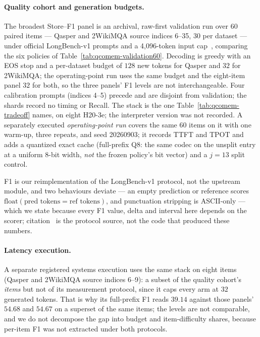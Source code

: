 \documentclass{article}
\begin{document}
\paragraph{Quality cohort and generation budgets.}
The broadest Store--F1 panel is an archival, raw-first validation run over 60
paired items --- Qasper and 2WikiMQA source indices 6--35, 30 per dataset ---
under official LongBench-v1 prompts and a 4,096-token input
cap~\citep{bai2024longbench,dasigi2021qasper,ho2020multihopqa}, comparing the
six policies of Table~\ref{tab:qcomem-validation60}.  Decoding is greedy with an EOS stop and a per-dataset budget of $128$
new tokens for Qasper and $32$ for 2WikiMQA; the operating-point run uses the
same budget and the eight-item panel $32$ for both, so the three panels' F1
levels are not interchangeable.  Four calibration prompts (indices 4--5) precede
and are disjoint from validation; the shards record no timing or Recall.  The stack is the one Table~\ref{tab:qcomem-tradeoff} names, on eight
H20-3e; the interpreter version was not recorded.  A separately executed
\emph{operating-point run} covers the same 60 items on it with one warm-up,
three repeats, and seed 20260903; it records TTFT and TPOT and adds a quantized
exact cache (full-prefix Q8: the same codec on the unsplit entry at a uniform
8-bit width, \emph{not} the frozen policy's bit vector) and a $j=13$ split
control.

F1 is our reimplementation of the LongBench-v1  protocol, not
the upstream module, and two behaviours deviate --- an empty prediction or
reference scores $\mathrm{float}(\text{pred tokens}=\text{ref tokens})$, and
punctuation stripping is ASCII-only --- which we state because every F1 value,
delta and interval here depends on the scorer; citation~\citep{bai2024longbenchcode}
is the protocol source, not the code that produced these numbers.

\paragraph{Latency execution.}
A separate registered systems execution uses the same stack on eight items
(Qasper and 2WikiMQA source indices 6--9): a subset of the quality cohort's
\emph{items} but not of its measurement protocol, since it caps every arm at $32$
generated tokens.  That is why its full-prefix F1 reads $39.14$ against those
panels' $54.68$ and $54.67$ on a superset of the same items; the levels are not
comparable, and we do not decompose the gap into budget and item-difficulty
shares, because per-item F1 was not extracted under both protocols.
\end{document}
